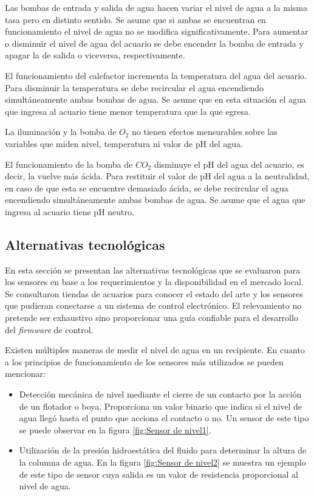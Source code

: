 Las bombas de entrada y salida de agua hacen variar el nivel de agua a la misma tasa pero en distinto sentido.  Se asume que si ambas se encuentran en funcionamiento el nivel de agua no se modifica significativamente.  Para aumentar o disminuir el nivel de agua del acuario se debe encender la bomba de entrada y apagar la de salida o viceversa, respectivamente.

El funcionamiento del calefactor incrementa la temperatura del agua del acuario.  Para disminuir la temperatura se debe recircular el agua encendiendo simultáneamente ambas bombas de agua.  Se asume que en esta situación el agua que ingresa al acuario tiene menor temperatura que la que egresa.

La iluminación y la bomba de $O_2$ no tienen efectos mensurables sobre las variables que miden nivel, temperatura ni valor de pH del agua.

El funcionamiento de la bomba de $CO_2$ disminuye el pH del agua del acuario, es decir, la vuelve más ácida.  Para restituir el valor de pH del agua a la neutralidad, en caso de que esta se encuentre demasiado ácida, se debe recircular el agua encendiendo simultáneamente ambas bombas de agua.  Se asume que el agua que ingresa al acuario tiene pH neutro.




\subsection{Alternativas tecnológicas}

En esta sección se presentan las alternativas tecnológicas que se evaluaron para los sensores en base a los requerimientos y la disponibilidad en el mercado local. Se consultaron tiendas de acuarios para conocer el estado del arte y los sensores que pudieran conectarse a un sistema de control electrónico. El relevamiento no pretende ser exhaustivo sino proporcionar una guía confiable para el desarrollo del \textit{firmware} de control.

Existen múltiples maneras de medir el nivel de agua en un recipiente.  En cuanto a los principios de funcionamiento de los sensores más utilizados se pueden mencionar:

\begin{itemize}
\item Detección mecánica de nivel mediante el cierre de un contacto por la acción de un flotador o boya.  Proporciona un valor binario que indica si el nivel de agua llegó hasta el punto que acciona el contacto o no.  Un sensor de este tipo se puede observar en la figura \ref{fig:Sensor de nivel1}.
\item Utilización de la presión hidroestática del fluido para determinar la altura de la columna de agua.  En la figura \ref{fig:Sensor de nivel2} se muestra un ejemplo de este tipo de sensor cuya salida es un valor de resistencia proporcional al nivel de agua.
\end{itemize}

